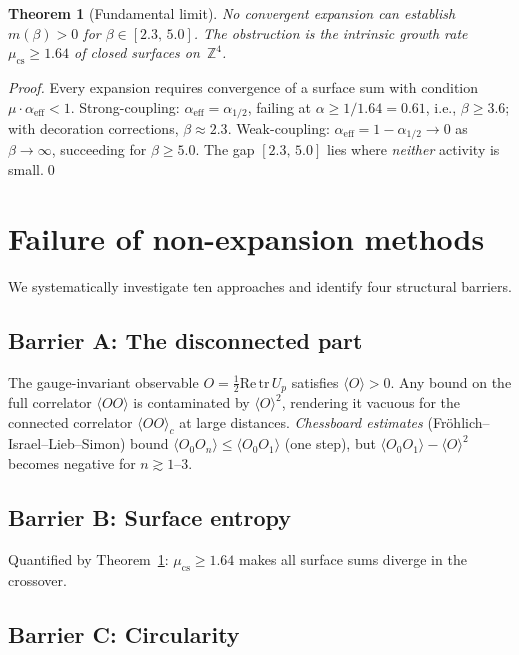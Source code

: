 \documentclass[12pt,a4paper]{article}
\newtheorem{theorem}{Theorem}[section]
\newcommand{\Z}{\mathbb{Z}}
\newcommand{\half}{\tfrac{1}{2}}
\newcommand{\tr}{\mathrm{tr}}
\begin{document}
\begin{theorem}[Fundamental limit]\label{thm:limit}
No convergent expansion can establish $m(\beta)>0$ for $\beta\in[2.3,\,5.0]$. The obstruction is the intrinsic growth rate $\mu_{\mathrm{cs}}\ge 1.64$ of closed surfaces on~$\Z^4$.
\end{theorem}

\begin{proof}
Every expansion requires convergence of a surface sum with condition $\mu\cdot\alpha_{\mathrm{eff}}<1$. Strong-coupling: $\alpha_{\mathrm{eff}}=\alpha_{1/2}$, failing at $\alpha\ge 1/1.64=0.61$, i.e., $\beta\ge 3.6$; with decoration corrections, $\beta\approx 2.3$. Weak-coupling: $\alpha_{\mathrm{eff}}=1-\alpha_{1/2}\to 0$ as $\beta\to\infty$, succeeding for $\beta\ge 5.0$. The gap $[2.3,\,5.0]$ lies where \emph{neither} activity is small.\qed
\end{proof}

\section{Failure of non-expansion methods}\label{sec:nonexp}

We systematically investigate ten approaches and identify four structural barriers.

\subsection{Barrier A: The disconnected part}

The gauge-invariant observable $O=\half\mathrm{Re}\,\tr\,U_p$ satisfies $\langle O\rangle > 0$. Any bound on the full correlator $\langle OO\rangle$ is contaminated by $\langle O\rangle^2$, rendering it vacuous for the connected correlator $\langle OO\rangle_c$ at large distances. \emph{Chessboard estimates} (Fr\"ohlich--Israel--Lieb--Simon) bound $\langle O_0 O_n\rangle\le\langle O_0 O_1\rangle$ (one step), but $\langle O_0 O_1\rangle - \langle O\rangle^2$ becomes negative for $n\gtrsim 1$--$3$.

\subsection{Barrier B: Surface entropy}

Quantified by Theorem~\ref{thm:limit}: $\mu_{\mathrm{cs}}\ge 1.64$ makes all surface sums diverge in the crossover.

\subsection{Barrier C: Circularity}
\end{document}
